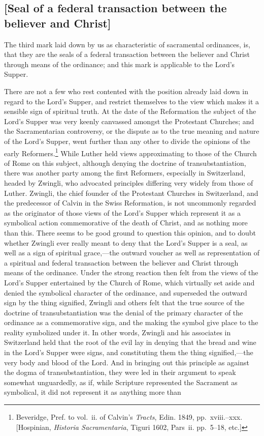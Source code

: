 \documentclass[
  english,
]{book}
\begin{document}
\hypertarget{seal-of-a-federal-transaction-between-the-believer-and-christ}{%
\subsection{{[}Seal of a federal transaction between the believer and Christ{]}}\label{seal-of-a-federal-transaction-between-the-believer-and-christ}}

The third mark laid down by us as characteristic of sacramental ordinances, is, that they are the seals of a federal transaction between the believer and Christ through means of the ordinance; and this mark is applicable to the Lord's Supper.

There are not a few who rest contented with the position already laid down in regard to the Lord's Supper, and restrict themselves to the view which makes it a sensible sign of spiritual truth. At the date of the Reformation the subject of the Lord's Supper was very keenly canvassed amongst the Protestant Churches; and the Sacramentarian controversy, or the dispute as to the true meaning and nature of the Lord's Supper, went further than any other to divide the opinions of the early Reformers.\footnote{Beveridge, Pref. to vol.~ii. of Calvin's \emph{Tracts}, Edin. 1849, pp.~xviii.--xxx. {[}Hospinian, \emph{Historia Sacramentaria}, Tiguri 1602, Pars~ii. pp.~5--18, etc.{]}} While Luther held views approximating to those of the Church of Rome on this subject, although denying the doctrine of transubstantiation, there was another party among the first Reformers, especially in Switzerland, headed by Zwingli, who advocated principles differing very widely from those of Luther. Zwingli, the chief founder of the Protestant Churches in Switzerland, and the predecessor of Calvin in the Swiss Reformation, is not uncommonly regarded as the originator of those views of the Lord's Supper which represent it as a symbolical action commemorative of the death of Christ, and as nothing more than this. There seems to be good ground to question this opinion, and to doubt whether Zwingli ever really meant to deny that the Lord's Supper is a seal, as well as a sign of spiritual grace,---the outward voucher as well as representation of a spiritual and federal transaction between the believer and Christ through means of the ordinance. Under the strong reaction then felt from the views of the Lord's Supper entertained by the Church of Rome, which virtually set aside and denied the symbolical character of the ordinance, and superseded the outward sign by the thing signified, Zwingli and others felt that the true source of the doctrine of transubstantiation was the denial of the primary character of the ordinance as a commemorative sign, and the making the symbol give place to the reality symbolized under it. In other words, Zwingli and his associates in Switzerland held that the root of the evil lay in denying that the bread and wine in the Lord's Supper were signs, and constituting them the thing signified,---the very body and blood of the Lord. And in bringing out this principle as against the dogma of transubstantiation, they were led in their argument to speak somewhat unguardedly, as if, while Scripture represented the Sacrament as symbolical, it did not represent it as anything more than 
\end{document}
